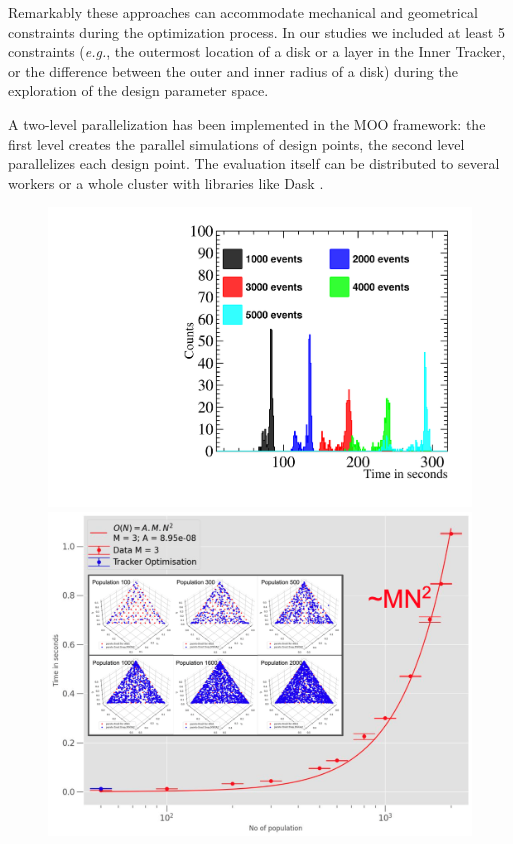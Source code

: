Remarkably these approaches can accommodate mechanical and geometrical constraints during the optimization process. In our studies we included at least 5 constraints (\textit{e.g.}, the outermost location of a disk or a layer in the Inner Tracker, or the difference between the outer and inner radius of a disk) during the exploration of the design parameter space.  

A two-level parallelization has been implemented in the MOO framework: the first level creates the parallel simulations of design points, the second level parallelizes each design point. 
The evaluation itself can be distributed to several workers or a whole cluster with libraries like Dask \cite{dask}.


\begin{figure}[!]
    \centering
    \includegraphics[scale = 0.33]{figs/TimeHistROOT.pdf}
    \includegraphics[scale = 0.18]{figs/AI_time_study.png}

\end{figure}
